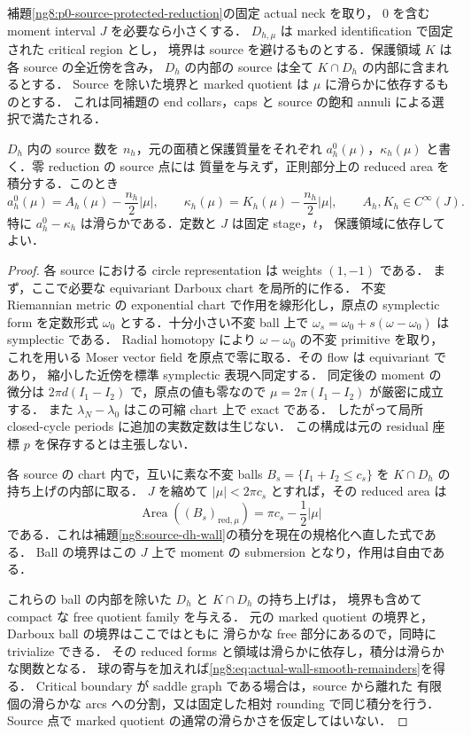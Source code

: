 \begin{lemma}
\label{ng8:actual-source-area-wall}
補題\ref{ng8:p0-source-protected-reduction}の固定 actual neck を取り，
$0$ を含む moment interval $J$ を必要なら小さくする．
$D_{h,\mu}$ は marked identification で固定された critical region とし，
境界は source を避けるものとする．保護領域 $K$ は各 source の全近傍を含み，
$D_h$ の内部の source は全て $K\cap D_h$ の内部に含まれるとする．
Source を除いた境界と marked quotient は $\mu$ に滑らかに依存するものとする．
これは同補題の end collars，caps と source の飽和 annuli による選択で満たされる．

$D_h$ 内の source 数を $n_h$，元の面積と保護質量をそれぞれ
$a_h^0(\mu)$，$\kappa_h(\mu)$ と書く．零 reduction の source 点には
質量を与えず，正則部分上の reduced area を積分する．このとき
\begin{equation}\label{ng8:eq:actual-wall-smooth-remainders}
 a_h^0(\mu)=A_h(\mu)-\frac{n_h}{2}|\mu|,
 \qquad
 \kappa_h(\mu)=K_h(\mu)-\frac{n_h}{2}|\mu|,
 \qquad A_h,K_h\in C^\infty(J).
\end{equation}
特に $a_h^0-\kappa_h$ は滑らかである．定数と $J$ は固定 stage，$t$，
保護領域に依存してよい．
\end{lemma}

\begin{proof}
各 source における circle representation は weights $(1,-1)$ である．
まず，ここで必要な equivariant Darboux chart を局所的に作る．
不変 Riemannian metric の exponential chart で作用を線形化し，原点の
symplectic form を定数形式 $\omega_0$ とする．十分小さい不変 ball 上で
$\omega_s=\omega_0+s(\omega-\omega_0)$ は symplectic である．
Radial homotopy により $\omega-\omega_0$ の不変 primitive を取り，
これを用いる Moser vector field を原点で零に取る．その flow は equivariant であり，
縮小した近傍を標準 symplectic 表現へ同定する．
同定後の moment の微分は $2\pi d(I_1-I_2)$ で，原点の値も零なので
$\mu=2\pi(I_1-I_2)$ が厳密に成立する．
また $\lambda_N-\lambda_0$ はこの可縮 chart 上で exact である．
したがって局所 closed-cycle periods に追加の実数定数は生じない．
この構成は元の residual 座標 $p$ を保存するとは主張しない．

各 source の chart 内で，互いに素な不変 balls
$B_s=\{I_1+I_2\le c_s\}$ を $K\cap D_h$ の持ち上げの内部に取る．
$J$ を縮めて $|\mu|<2\pi c_s$ とすれば，その reduced area は
\[
 \operatorname{Area}((B_s)_{\mathrm{red},\mu})
 =\pi c_s-\frac12|\mu|
\]
である．これは補題\ref{ng8:source-dh-wall}の積分を現在の規格化へ直した式である．
Ball の境界はこの $J$ 上で moment の submersion となり，作用は自由である．

これらの ball の内部を除いた $D_h$ と $K\cap D_h$ の持ち上げは，
境界も含めて compact な free quotient family を与える．
元の marked quotient の境界と，Darboux ball の境界はここではともに
滑らかな free 部分にあるので，同時に trivialize できる．
その reduced forms と領域は滑らかに依存し，積分は滑らかな関数となる．
球の寄与を加えれば\eqref{ng8:eq:actual-wall-smooth-remainders}を得る．
Critical boundary が saddle graph である場合は，source から離れた
有限個の滑らかな arcs への分割，又は固定した相対 rounding で同じ積分を行う．
Source 点で marked quotient の通常の滑らかさを仮定してはいない．
\end{proof}

